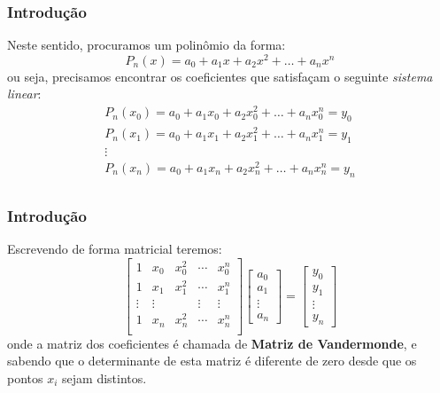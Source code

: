 \documentclass{beamer}
\theoremstyle{mystyle}
\begin{document}
\begin{frame}
	\frametitle{Introdução}
	Neste sentido, procuramos um polinômio da forma:
	\begin{equation*}
		P_{n}(x) = a_{0} + a_{1}x + a_{2}x^{2} +\ldots+ a_{n}x^{n} 
	\end{equation*}
	ou seja, precisamos encontrar os coeficientes que satisfaçam o seguinte \textit{sistema linear}:
	\begin{gather*}
		P_{n}(x_{0}) = a_{0} + a_{1}x_{0} + a_{2}x_{0}^{2} +\ldots+ a_{n}x_{0}^{n} = y_{0}\\
		P_{n}(x_{1}) = a_{0} + a_{1}x_{1} + a_{2}x_{1}^{2} +\ldots+ a_{n}x_{1}^{n} = y_{1}\\
		\vdots\\
		P_{n}(x_{n}) = a_{0} + a_{1}x_{n} + a_{2}x_{n}^{2} +\ldots+ a_{n}x_{n}^{n} = y_{n}\\
	\end{gather*}
\end{frame}

\begin{frame}
	\frametitle{Introdução}
	Escrevendo de forma matricial teremos:
	\begin{equation*}
		\left[
		\begin{array}{ccccc}
			1 & x_{0} & x_{0}^{2} & \cdots & x_{0}^{n} \\
			1 & x_{1} & x_{1}^{2} & \cdots & x_{1}^{n} \\
			\vdots & \vdots & & \vdots & \vdots \\
			1 & x_{n} & x_{n}^{2} & \cdots & x_{n}^{n} \\
		\end{array}
		\right] 
		\begin{bmatrix} a_{0} \\ a_{1} \\ \vdots \\ a_{n} \end{bmatrix}
		=
		\begin{bmatrix} y_{0} \\ y_{1} \\ \vdots \\ y_{n} \end{bmatrix}
	\end{equation*}
	onde a matriz dos coeficientes é chamada de \textbf{Matriz de Vandermonde}, e sabendo que o determinante de esta matriz é diferente de zero desde que os pontos $ x_{i} $ sejam distintos.
\end{frame}
\end{document}
